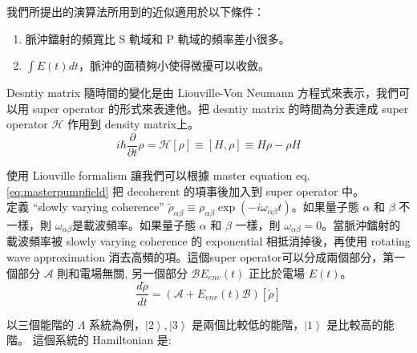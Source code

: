 \documentclass[11pt,a4paper]{article}
\begin{document}
我們所提出的演算法所用到的近似適用於以下條件：

\begin{enumerate}
  \item 脈沖鐳射的頻寬比 S 軌域和 P 軌域的頻率差小很多。
\item $\int E(t) dt$，脈沖的面積夠小使得微擾可以收斂。
\end{enumerate}

Desntiy matrix 隨時間的變化是由 Liouville-Von Neumann 方程式來表示，我們可以用 super operator 的形式來表達他。把 desntiy matrix 的時間為分表達成 super operator $\mathcal{H}$ 作用到 density matrix上。\\

\begin{equation}
i \hbar \frac{\partial}{\partial t}\rho = \mathcal{H}[\rho] \equiv [H,\rho] \equiv H\rho - \rho H
\end{equation}

使用 Liouville formalism 讓我們可以根據 master equation eq.\ref{eq:masterpumpfield} 把 decoherent 的項事後加入到 super operator 中。\\

定義 ``slowly varying coherence'' $\tilde{\rho}_{\alpha\beta} \equiv \rho_{\alpha\beta} \exp \left( -i \omega_{\alpha\beta} t \right)$。如果量子態 $\alpha$ 和 $\beta$ 不一樣，則 $\omega_{\alpha\beta}$是載波頻率。如果量子態 $\alpha$ 和 $\beta$ 一樣，則 $\omega_{\alpha\beta} = 0$。當脈沖鐳射的載波頻率被 slowly varying coherence 的 exponential 相抵消掉後，再使用 rotating wave approximation 消去高頻的項。這個super operator可以分成兩個部分，第一個部分 $\mathcal{A}$ 則和電場無關, 另一個部分 $\mathcal{B} E_{env} \left( t \right)$ 正比於電場 $E \left( t \right)$。\\

\begin{equation}
\frac{d\tilde{\rho}}{dt} = \left( \mathcal{A} + E_{env}\left( t \right) \mathcal{B}\right) \left[  \tilde{\rho}\right]
\end{equation}

以三個能階的 $\Lambda$ 系統為例，$\left| 2 \right\rangle,\left| 3 \right\rangle$ 是兩個比較低的能階，$\left| 1 \right\rangle$ 是比較高的能階。 這個系統的 Hamiltonian 是:\\
\end{document}
